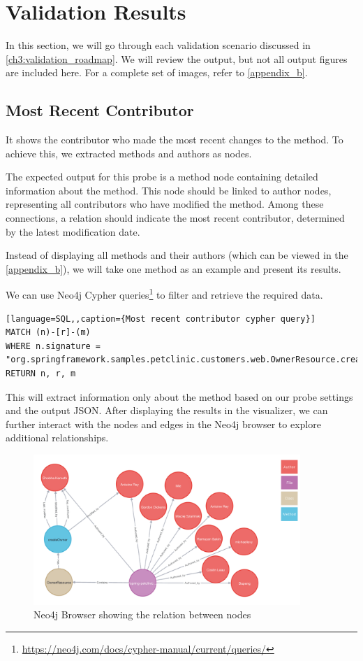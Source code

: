 \section{Validation Results}

In this section, we will go through each validation scenario discussed in \autoref{ch3:validation_roadmap}. We will review the output, but not all output figures are included here. For a complete set of images, refer to \autoref{appendix_b}.

\subsection{Most Recent Contributor}
It shows the contributor who made the most recent changes to the method. To achieve this, we extracted methods and authors as nodes.

The expected output for this probe is a method node containing detailed information about the method. This node should be linked to author nodes, representing all contributors who have modified the method. Among these connections, a relation should indicate the most recent contributor, determined by the latest modification date.

Instead of displaying all methods and their authors (which can be viewed in the \autoref{appendix_b}), we will take one method as an example and present its results.

We can use Neo4j Cypher queries\footnote{\url{https://neo4j.com/docs/cypher-manual/current/queries/}} to filter and retrieve the required data.

\begin{lstlisting}[language=SQL,,caption={Most recent contributor cypher query}]
MATCH (n)-[r]-(m)
WHERE n.signature = "org.springframework.samples.petclinic.customers.web.OwnerResource.createOwner(org.springframework.samples.petclinic.customers.web.OwnerRequest)"
RETURN n, r, m
\end{lstlisting}

This will extract information only about the method based on our probe settings and the output JSON. After displaying the results in the visualizer, we can further interact with the nodes and edges in the Neo4j browser to explore additional relationships.

\begin{figure}[ht]
    \centering
    \includegraphics[width=0.9\textwidth]{figures/author_file_class_method_relation.png}
    \caption{Neo4j Browser showing the relation between nodes}
    \label{fig:scenerio_1_2_3_overview}
\end{figure}

